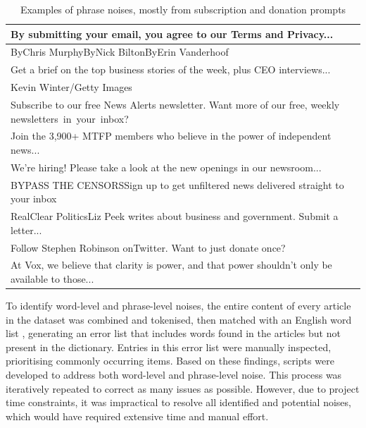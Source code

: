 \begin{table}[htbp]
    \centering
    \scriptsize
    \begin{tabular}{| l |}
        \hline
        By submitting your email, you agree to our Terms and Privacy...                                        \\
        \hline
        ByChris MurphyByNick BiltonByErin Vanderhoof                                                           \\
        \hline
        Get a brief on the top business stories of the week, plus CEO interviews...                            \\
        \hline
        Kevin Winter/Getty Images                                                                              \\
        \hline
        Subscribe to our free News Alerts newsletter. Want more of our free, weekly newsletters in your inbox? \\
        \hline
        Join the 3,900+ MTFP members who believe in the power of independent news...                           \\
        \hline
        We're hiring! Please take a look at the new openings in our newsroom...                                \\
        \hline
        BYPASS THE CENSORSSign up to get unfiltered news delivered straight to your inbox                      \\
        \hline
        RealClear PoliticsLiz Peek writes about business and government. Submit a letter...                    \\
        \hline
        Follow Stephen Robinson onTwitter. Want to just donate once?                                           \\
        \hline
        At Vox, we believe that clarity is power, and that power shouldn’t only be available to those...       \\
        \hline
    \end{tabular}
    \caption{Examples of phrase noises, mostly from subscription and donation prompts}
    \label{table:noise_phrases}
\end{table}

To identify word-level and phrase-level noises, the entire content of every article in the dataset was combined and tokenised, then matched with an English word list \cite{dwyl-english-words}, generating an error list that includes words found in the articles but not present in the dictionary. Entries in this error list were manually inspected, prioritising commonly occurring items. Based on these findings, scripts were developed to address both word-level and phrase-level noise. This process was iteratively repeated to correct as many issues as possible. However, due to project time constraints, it was impractical to resolve all identified and potential noises, which would have required extensive time and manual effort.

